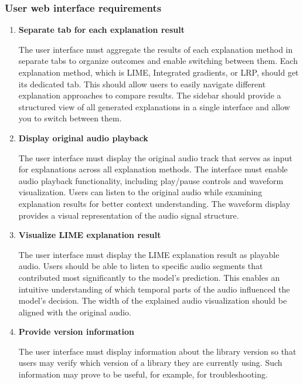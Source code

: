 \documentclass[
    bindingoffset=5mm,  %
    footnoteindent=3mm, %
    hyphenation=true    %
]{src/wut-thesis}
\begin{document}
\subsubsection{User web interface requirements}
    \begin{enumerate}[itemsep=1\baselineskip]
    \item \textbf{Separate tab for each explanation result}

        The user interface must aggregate the results of each explanation method in separate tabs to
    organize outcomes and enable switching between them. Each explanation method, which is LIME,
    Integrated gradients, or LRP, should get its dedicated tab. This should allow users to easily
    navigate different explanation approaches to compare results. The sidebar should provide a
    structured view of all generated explanations in a single interface and allow you to
    switch between them.

    \item \textbf{Display original audio playback}

        The user interface must display the original audio track that serves as input for explanations
    across all explanation methods. The interface must enable audio playback functionality,
    including play/pause controls and waveform visualization. Users can listen to the original
    audio while examining explanation results for better context understanding. The waveform display
    provides a visual representation of the audio signal structure.

    \item \textbf{Visualize LIME explanation result}

        The user interface must display the LIME explanation result as playable audio.
    Users should be able to listen to specific audio segments that contributed most significantly
    to the model's prediction. This enables an intuitive understanding of which temporal parts of
    the audio influenced the model's decision. The width of the explained audio visualization
    should be aligned with the original audio.

    \item \textbf{Provide version information}

        The user interface must display information about the library version so that users may verify which
    version of a library they are currently using. Such information may prove to be useful,
    for example, for troubleshooting.


\end{enumerate}
\end{document}

